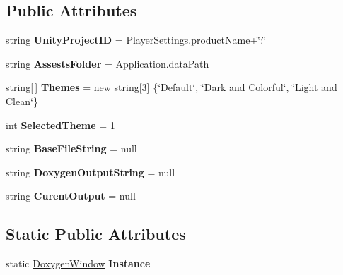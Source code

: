 \subsection*{Public Attributes}
\begin{DoxyCompactItemize}
\item 
string {\bfseries Unity\+Project\+ID} = Player\+Settings.\+product\+Name+\char`\"{}\+:\char`\"{}\hypertarget{class_doxygen_window_a0c52f34973444c41e90151536dbd6e82}{}\label{class_doxygen_window_a0c52f34973444c41e90151536dbd6e82}

\item 
string {\bfseries Assests\+Folder} = Application.\+data\+Path\hypertarget{class_doxygen_window_a470870b3c6a44b3fe2f57870e39cfe55}{}\label{class_doxygen_window_a470870b3c6a44b3fe2f57870e39cfe55}

\item 
string\mbox{[}$\,$\mbox{]} {\bfseries Themes} = new string\mbox{[}3\mbox{]} \{\char`\"{}Default\char`\"{}, \char`\"{}Dark and Colorful\char`\"{}, \char`\"{}Light and Clean\char`\"{}\}\hypertarget{class_doxygen_window_a2dfb0ba26737a0e996797c2848cc2fc0}{}\label{class_doxygen_window_a2dfb0ba26737a0e996797c2848cc2fc0}

\item 
int {\bfseries Selected\+Theme} = 1\hypertarget{class_doxygen_window_aff9bfc8c7ed3f017a61e67025ea7c99a}{}\label{class_doxygen_window_aff9bfc8c7ed3f017a61e67025ea7c99a}

\item 
string {\bfseries Base\+File\+String} = null\hypertarget{class_doxygen_window_a7a4acfac0a07a2a05f183e4f0bc53b62}{}\label{class_doxygen_window_a7a4acfac0a07a2a05f183e4f0bc53b62}

\item 
string {\bfseries Doxygen\+Output\+String} = null\hypertarget{class_doxygen_window_a20e7d1bdb1f32c97f600bf0f0bdb2358}{}\label{class_doxygen_window_a20e7d1bdb1f32c97f600bf0f0bdb2358}

\item 
string {\bfseries Curent\+Output} = null\hypertarget{class_doxygen_window_a82b41ae2e3c44b050acc7603031ccd55}{}\label{class_doxygen_window_a82b41ae2e3c44b050acc7603031ccd55}

\end{DoxyCompactItemize}
\subsection*{Static Public Attributes}
\begin{DoxyCompactItemize}
\item 
static \hyperlink{class_doxygen_window}{Doxygen\+Window} {\bfseries Instance}\hypertarget{class_doxygen_window_a45d09c9a64d2873367470303789e3bf9}{}\label{class_doxygen_window_a45d09c9a64d2873367470303789e3bf9}

\end{DoxyCompactItemize}


